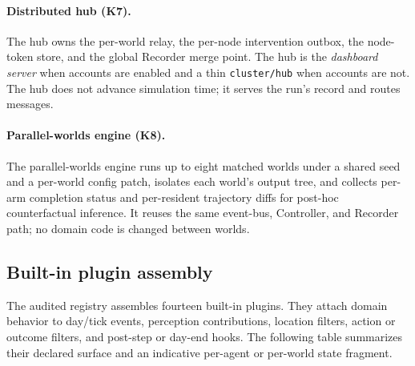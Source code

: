 \paragraph{Distributed hub (K7).}
The hub owns the per-world relay, the per-node intervention outbox, the
node-token store, and the global Recorder merge point.  The hub is the
\emph{dashboard server} when accounts are enabled and a thin
\texttt{cluster/hub} when accounts are not.  The hub does not advance
simulation time; it serves the run's record and routes messages.

\paragraph{Parallel-worlds engine (K8).}
The parallel-worlds engine runs up to eight matched worlds under a shared
seed and a per-world config patch, isolates each world's output tree, and
collects per-arm completion status and per-resident trajectory diffs for
post-hoc counterfactual inference.  It reuses the same event-bus,
Controller, and Recorder path; no domain code is changed between worlds.

\subsection{Built-in plugin assembly}

The audited registry assembles fourteen built-in plugins.  They attach
domain behavior to day/tick events, perception contributions, location
filters, action or outcome filters, and post-step or day-end hooks.  The
following table summarizes their declared surface and an indicative
per-agent or per-world state fragment.

